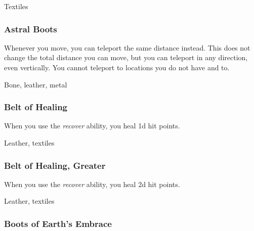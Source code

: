  Textiles


\lowercase{\hypertarget{item:Astral Boots}{}}\label{item:Astral Boots}
\hypertarget{item:Astral Boots}{\subsubsection{Astral Boots\hfill{}}}

Whenever you move, you can teleport the same distance instead.
This does not change the total distance you can move, but you can teleport in any direction, even vertically.
You cannot teleport to locations you do not have  and  to.



 


 Bone, leather, metal


\lowercase{\hypertarget{item:Belt of Healing}{}}\label{item:Belt of Healing}
\hypertarget{item:Belt of Healing}{\subsubsection{Belt of Healing\hfill{}}}

When you use the \textit{recover} ability, you heal \plus1d hit points.



 


 Leather, textiles


\lowercase{\hypertarget{item:Belt of Healing, Greater}{}}\label{item:Belt of Healing, Greater}
\hypertarget{item:Belt of Healing, Greater}{\subsubsection{Belt of Healing, Greater\hfill{}}}

When you use the \textit{recover} ability, you heal \plus2d hit points.



 


 Leather, textiles


\lowercase{\hypertarget{item:Boots of Earth's Embrace}{}}\label{item:Boots of Earth's Embrace}
\hypertarget{item:Boots of Earth's Embrace}{\subsubsection{Boots of Earth's Embrace\hfill{}}}

